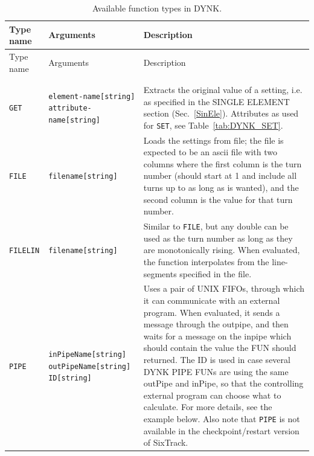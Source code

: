 \begin{center}
\small
\begin{longtable}{|p{1.8cm} | p{4.1cm} | p{9.5cm}|}
    \caption{Available function types in DYNK.}
    \label{tab:DYNK_FUN} \\*
    \hline
    \rowcolor{blue!30}
    Type name & Arguments & Description \\*
    \hline
    \endfirsthead

    \hline
    \rowcolor{blue!30}
    Type name & Arguments & Description \\*
    \endhead

    \rowcolor{gray!15}
    \multicolumn{3}{|c|}{(The table continues on the next page)}\\*
    \hline
    \endfoot

    \hline
    \endlastfoot

    \rowcolor{blue!15}
    \multicolumn{3}{|l|}{``System'' functions} \\*
    \hline

    \texttt{GET} & \texttt{element-name[string] attribute-name[string]} &
    Extracts the original value of a setting, i.e. as specified in the SINGLE ELEMENT section (Sec.~\ref{SinEle}). Attributes as used for \texttt{SET}, see Table~\ref{tab:DYNK_SET}. \\*
    \hline

    \texttt{FILE} & \texttt{filename[string]} &
    Loads the settings from file; the file is expected to be an ascii file with two columns where the first column is the turn number (should start at 1 and include all turns up to as long as is wanted), and the second column is the value for that turn number.\\*
    \hline

    \texttt{FILELIN} & \texttt{filename[string]} &
    Similar to \texttt{FILE}, but any double can be used as the turn number as long as they are monotonically rising.
    When evaluated, the function interpolates from the line-segments specified in the file. \\*
    \hline

    \texttt{PIPE} & \texttt{inPipeName[string] outPipeName[string] ID[string]} &
    Uses a pair of UNIX FIFOs, through which it can communicate with an external program.
    When evaluated, it sends a message through the outpipe, and then waits for a message on the inpipe which should contain the value the FUN should returned.
    The ID is used in case several DYNK PIPE FUNs are using the same outPipe and inPipe, so that the controlling external program can choose what to calculate.
    For more details, see the example below.
    Also note that \texttt{PIPE} is not available in the checkpoint/restart version of SixTrack.\\*
    \hline


\end{longtable}
\end{center}
